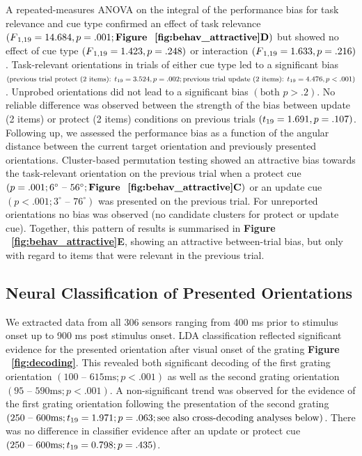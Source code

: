 \documentclass{article}
\begin{document}
A repeated-measures ANOVA on the integral of the performance bias for task relevance and cue type confirmed an effect of task relevance $(F\textsubscript{1,19}  = 14.684, p = .001; \text{\textbf{Figure ~\ref{fig:behav_attractive}D}})$ but showed no effect of cue type $(F\textsubscript{1,19}  = 1.423, p = .248)$ or interaction $(F\textsubscript{1,19} = 1.633, p = .216)$. Task-relevant orientations in trials of either cue type led to a significant bias $(\text{previous trial protect (2 items): } t\textsubscript{19} = 3.524, p = .002; \text{previous trial update (2 items): } t\textsubscript{19} = 4.476, p < .001)$. Unprobed orientations did not lead to a significant bias $(\text{both } p > .2)$. No reliable difference was observed between the strength of the bias between update (2 items) or protect (2 items) conditions on previous trials $(t\textsubscript{19} = 1.691, p = .107)$. Following up, we assessed the performance bias as a function of the angular distance between the current target orientation and previously presented orientations. Cluster-based permutation testing showed an attractive bias towards the task-relevant orientation on the previous trial when a protect cue $(p = .001; 6^\circ \text{ – } 56^\circ; \text{\textbf{Figure ~\ref{fig:behav_attractive}C}})$ or an update cue $(p < .001; 3^\circ \text{ – } 76^\circ)$ was presented on the previous trial. For unreported orientations no bias was observed (no candidate clusters for protect or update cue). Together, this pattern of results is summarised in \textbf{Figure ~\ref{fig:behav_attractive}E}, showing an attractive between-trial bias, but only with regard to items that were relevant in the previous trial. \\


\subsection{Neural Classification of Presented Orientations}
We extracted data from all 306 sensors ranging from 400 ms prior to stimulus onset up to 900 ms post stimulus onset. LDA classification reflected significant evidence for the presented orientation after visual onset of the grating \textbf{Figure ~\ref{fig:decoding}}. This revealed both significant decoding of the first grating orientation $(100 \text{ – } 615 \text{ms}; p < .001)$ as well as the second grating orientation $(95 \text{ – } 590 \text{ms}; p < .001)$. A non-significant trend was observed for the evidence of the first grating orientation following the presentation of the second grating $(250 \text{ – } 600 \text{ms}; t\textsubscript{19} = 1.971; p = .063; \text{see also cross-decoding analyses below})$. There was no difference in classifier evidence after an update or protect cue $(250 \text{ – } 600 \text{ms}; t\textsubscript{19} = 0.798; p = .435)$. \\
\end{document}
